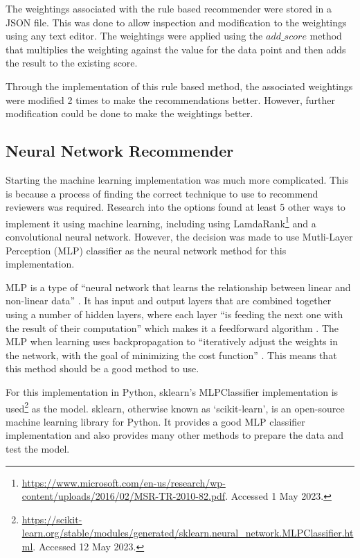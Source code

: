 The weightings associated with the rule based recommender were stored in a JSON file. This was done to allow inspection and modification to the weightings using any text editor. The weightings were applied using the $add\_score$ method that multiplies the weighting against the value for the data point and then adds the result to the existing score.

Through the implementation of this rule based method, the associated weightings were modified 2 times to make the recommendations better. However, further modification could be done to make the weightings better.

\subsection{Neural Network Recommender\label{section:neural-network-recommender-implementation}}

Starting the machine learning implementation was much more complicated. This is because a process of finding the correct technique to use to recommend reviewers was required. Research into the options found at least 5 other ways to implement it using machine learning, including using LamdaRank\footnote{\url{https://www.microsoft.com/en-us/research/wp-content/uploads/2016/02/MSR-TR-2010-82.pdf}. Accessed 1 May 2023.} and a convolutional neural network. However, the decision was made to use Mutli-Layer Perception (MLP) classifier as the neural network method for this implementation.

MLP is a type of ``neural network that learns the relationship between linear and non-linear data'' \citep{towardsdatascience:mlp-classifier}. It has input and output layers that are combined together using a number of hidden layers, where each layer ``is feeding the next one with the result of their computation'' which makes it a feedforward algorithm \citep{towardsdatascience:mlp-classifier}. The MLP when learning uses backpropagation to ``iteratively adjust the weights in the network, with the goal of minimizing the cost function'' \citep{towardsdatascience:mlp-classifier}. This means that this method should be a good method to use.

For this implementation in Python, sklearn's MLPClassifier implementation is used\footnote{\def\UrlBreaks{\do\/\do-\do.}\url{https://scikit-learn.org/stable/modules/generated/sklearn.neural\_network.MLPClassifier.html}. Accessed 12 May 2023.\def\UrlBreaks{\do\/\do-}} as the model. sklearn, otherwise known as `scikit-learn', is an open-source machine learning library for Python. It provides a good MLP classifier implementation and also provides many other methods to prepare the data and test the model.

